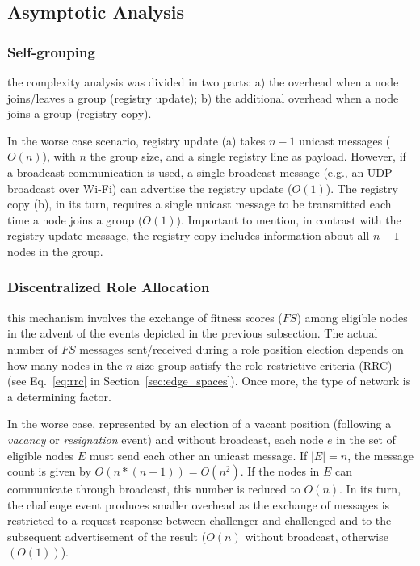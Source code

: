 \subsection{Asymptotic Analysis} 

\subsubsection{\textbf{Self-grouping}} the complexity analysis was divided in two parts: a) the overhead when a node joins/leaves a group (registry update); b) the additional overhead when a node joins a group (registry copy).

In the worse case scenario, registry update (a) takes $n-1$ unicast messages ($O(n)$), with $n$ the group size, and a single registry line as payload. However, if a broadcast communication is used, a single broadcast message (e.g., an UDP broadcast over Wi-Fi) can advertise the registry update ($O(1)$).
The registry copy (b), in its turn, requires a single unicast message to be transmitted each time a node joins a group ($O(1)$). Important to mention, in contrast with the registry update message, the registry copy includes information about all $n-1$ nodes in the group. 

\subsubsection{\textbf{Discentralized Role Allocation}} 


this mechanism involves the exchange of fitness scores ($FS$) among eligible nodes in the advent of the events depicted in the previous subsection. The actual number of $FS$ messages sent/received during a role position election depends on how many nodes in the $n$ size group satisfy the role restrictive criteria (RRC) (see Eq.~\ref{eq:rrc} in Section~\ref{sec:edge_spaces}). Once more, the type of network is a determining factor.

In the worse case, represented by an election of a vacant position (following a \textit{vacancy} or \textit{resignation} event) and without broadcast, each node $e$ in the set of eligible nodes $E$ must send each other an unicast message. If $|E| = n$, the message count is given by $O(n * (n-1)) = O(n^2)$. If the nodes in $E$ can communicate through broadcast, this number is reduced to $O(n)$. In its turn, the challenge event produces smaller overhead as the exchange of messages is restricted to a request-response between challenger and challenged and to the subsequent advertisement of the result ($O(n)$ without broadcast, otherwise $(O(1))$). 

